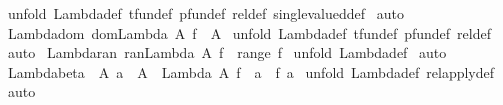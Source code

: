 \begin{isabellebody}
%
\isadelimproof
%
\endisadelimproof
%
\isatagproof
{}\isamarkupfalse%
\ {\isacharparenleft}unfold\ Lambda{\isacharunderscore}def\ tfun{\isacharunderscore}def\ pfun{\isacharunderscore}def\ rel{\isacharunderscore}def\ single{\isacharunderscore}valued{\isacharunderscore}def{\isacharparenright}\isanewline
{}\isamarkupfalse%
\ auto\isanewline
{}\isamarkupfalse%
%
\endisatagproof
{\isafoldproof}%
%
\isadelimproof
\isanewline
%
\endisadelimproof
\isanewline
\isanewline
{}\isamarkupfalse%
\ Lambda{\isacharunderscore}dom{\isacharcolon}\ {\isachardoublequoteopen}dom{\isacharparenleft}Lambda\ A\ f{\isacharparenright}\ {\isacharequal}\ A{\isachardoublequoteclose}\isanewline
%
\isadelimproof
%
\endisadelimproof
%
\isatagproof
{}\isamarkupfalse%
\ {\isacharparenleft}unfold\ Lambda{\isacharunderscore}def\ tfun{\isacharunderscore}def\ pfun{\isacharunderscore}def\ rel{\isacharunderscore}def{\isacharparenright}\ \isanewline
{}\isamarkupfalse%
\ auto\isanewline
{}\isamarkupfalse%
%
\endisatagproof
{\isafoldproof}%
%
\isadelimproof
\isanewline
%
\endisadelimproof
\isanewline
\isanewline
{}\isamarkupfalse%
\ Lambda{\isacharunderscore}ran{\isacharcolon}\ {\isachardoublequoteopen}ran{\isacharparenleft}Lambda\ A\ f{\isacharparenright}\ {\isacharless}{\isacharequal}\ range\ f{\isachardoublequoteclose}\isanewline
%
\isadelimproof
%
\endisadelimproof
%
\isatagproof
{}\isamarkupfalse%
\ {\isacharparenleft}unfold\ Lambda{\isacharunderscore}def{\isacharparenright}\isanewline
{}\isamarkupfalse%
\ auto\isanewline
{}\isamarkupfalse%
%
\endisatagproof
{\isafoldproof}%
%
\isadelimproof
\isanewline
%
\endisadelimproof
\isanewline
\isanewline
{}\isamarkupfalse%
\ Lambda{\isacharunderscore}beta{\isacharcolon}\ {\isachardoublequoteopen}{\isacharbang}{\isacharbang}\ A{\isachardot}\ a\ {\isacharcolon}\ A\ {\isacharequal}{\isacharequal}{\isachargreater}\ {\isacharparenleft}{\isacharparenleft}Lambda\ A\ f{\isacharparenright}\ {\isacharpercent}{\isacharcircum}\ a{\isacharparenright}\ {\isacharequal}\ f\ a{\isachardoublequoteclose}\isanewline
%
\isadelimproof
%
\endisadelimproof
%
\isatagproof
{}\isamarkupfalse%
\ {\isacharparenleft}unfold\ Lambda{\isacharunderscore}def\ rel{\isacharunderscore}apply{\isacharunderscore}def{\isacharparenright}\isanewline
{}\isamarkupfalse%
\ auto\isanewline
{}\isamarkupfalse%
%
\endisatagproof
{\isafoldproof}%
%
\isadelimproof
\isanewline

\end{isabellebody}
